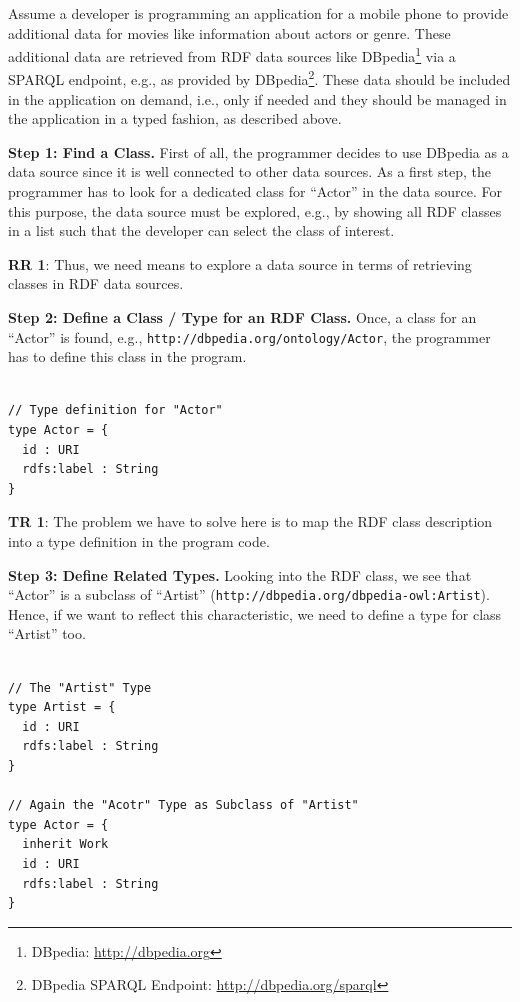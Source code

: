 \documentclass{llncs} %
\newcommand{\rr}[1]{\textbf{RR #1}}
\newcommand{\tr}[1]{\textbf{TR #1}}
\begin{document}
Assume a developer is programming an application for a mobile phone to provide additional
data for movies like information about actors or genre. These additional data
are retrieved from RDF data sources like DBpedia\footnote{DBpedia: \url{http://dbpedia.org}} via a SPARQL endpoint,
e.g., as provided by DBpedia\footnote{DBpedia SPARQL Endpoint: \url{http://dbpedia.org/sparql}}.
These data should be included in the application on demand, i.e., only if needed
and they should be managed in the application in a typed fashion,
as described above.

\vspace{0.8em}
\noindent
\textbf{Step 1: Find a Class.}
First of all, the programmer decides to use DBpedia as a data source since it is well connected to other
data sources. As a first step, the programmer has to look for a dedicated class for ``Actor'' in the data source.
For this purpose, the data source must be explored, e.g., by showing all RDF classes in a list
such that the developer can select the class of interest.

\rr{1}: Thus, we need means to explore a data source in terms of retrieving classes in RDF data sources.

\vspace{0.8em}
\noindent
\textbf{Step 2: Define a Class / Type for  an RDF Class.}
Once, a class for an ``Actor'' is found, e.g., \texttt{http://dbpedia.org/ontology/Actor}, the programmer has
to define this class in the program.

\begin{lstlisting}[style=code, caption={Type Definition for RDF Class ``Movie''}, label={lst:movietype}]

// Type definition for "Actor" 
type Actor = {
  id : URI
  rdfs:label : String 
}
\end{lstlisting}

\tr{1}: The problem we have to solve here is to map the RDF class description into a type definition in the program code.

\vspace{0.8em}
\noindent
\textbf{Step 3: Define Related Types.}
Looking into the RDF class, we see that ``Actor'' is a subclass of ``Artist'' (\texttt{http://dbpedia.org/dbpedia-owl:Artist}).
Hence, if we want to reflect this characteristic, we need to define a type for class ``Artist'' too.

\begin{lstlisting}[style=code, caption={Type Definition for RDF Classes ``Actor'' and ``Artist''}, label={lst:worktype}]

// The "Artist" Type
type Artist = {
  id : URI
  rdfs:label : String
}

// Again the "Acotr" Type as Subclass of "Artist"
type Actor = {
  inherit Work
  id : URI
  rdfs:label : String
}
\end{lstlisting}
\end{document}
